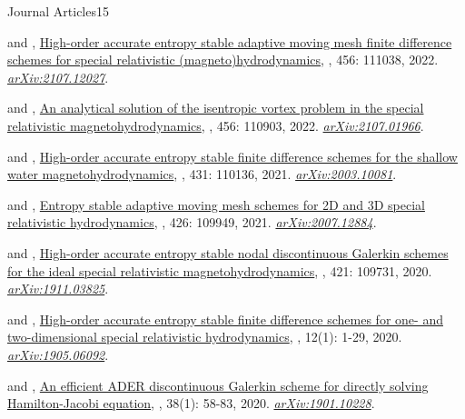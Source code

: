 \begin{cvpublicationsection}{Journal Articles}{15}
%
\item {} and , \href{https://doi.org/10.1016/j.jcp.2022.111038}{High-order accurate entropy stable adaptive moving mesh finite difference schemes for special relativistic (magneto)hydrodynamics}, , 456: 111038, 2022. \href{https://arxiv.org/abs/2107.12027}{\em arXiv:2107.12027}.
%
\item {} and , \href{https://doi.org/10.1016/j.jcp.2021.110903}{An analytical solution of the isentropic vortex problem in the special relativistic magnetohydrodynamics}, , 456: 110903, 2022. \href{https://arxiv.org/abs/2107.01966}{\em arXiv:2107.01966}.
%
\item {} and , \href{https://doi.org/10.1016/j.jcp.2021.110136}{High-order accurate entropy stable finite difference schemes for the shallow water magnetohydrodynamics}, , 431: 110136, 2021. \href{https://arxiv.org/abs/2003.10081}{\em arXiv:2003.10081}.
%
\item {} and , \href{https://doi.org/10.1016/j.jcp.2020.109949}{Entropy stable adaptive moving mesh schemes for 2D and 3D special relativistic hydrodynamics}, , 426: 109949, 2021. \href{https://arxiv.org/abs/2007.12884}{\em arXiv:2007.12884}.
%
\item {} and , \href{https://doi.org/10.1016/j.jcp.2020.109731}{High-order accurate entropy stable nodal discontinuous Galerkin schemes for the ideal special relativistic magnetohydrodynamics}, , 421: 109731, 2020. \href{https://arxiv.org/abs/1911.03825}{\em arXiv:1911.03825}.
%
\item {} and , \href{https://doi.org/10.4208/aamm.OA-2019-0124}{High-order accurate entropy stable finite difference schemes for one- and two-dimensional special relativistic hydrodynamics}, , 12(1): 1-29, 2020. \href{https://arxiv.org/abs/1905.06092}{\em arXiv:1905.06092}.
%
\item {} and , \href{https://doi.org/10.4208/jcm.1902-m2018-0189}{An efficient ADER discontinuous Galerkin scheme for directly solving Hamilton-Jacobi equation}, , 38(1): 58-83, 2020. \href{https://arxiv.org/abs/1901.10228}{\em arXiv:1901.10228}.

\end{cvpublicationsection}
